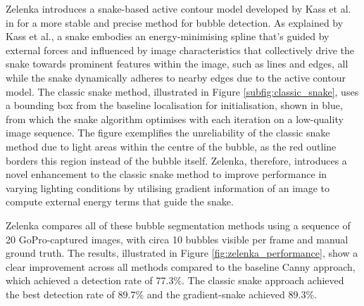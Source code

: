 Zelenka introduces a snake-based active contour model developed by Kass et al. in \cite{kassSnakesActiveContour1988} for a more stable and precise method for bubble detection. As explained by Kass et al., a snake embodies an energy-minimising spline that's guided by external forces and influenced by image characteristics that collectively drive the snake towards prominent features within the image, such as lines and edges, all while the snake dynamically adheres to nearby edges due to the active contour model. The classic snake method, illustrated in Figure \ref{subfig:classic_snake}, uses a bounding box from the baseline localisation for initialisation, shown in blue, from which the snake algorithm optimises with each iteration on a low-quality image sequence. The figure exemplifies the unreliability of the classic snake method due to light areas within the centre of the bubble, as the red outline borders this region instead of the bubble itself. Zelenka, therefore, introduces a novel enhancement to the classic snake method to improve performance in varying lighting conditions by utilising gradient information of an image to compute external energy terms that guide the snake.

Zelenka compares all of these bubble segmentation methods using a sequence of 20 GoPro-captured images, with circa 10 bubbles visible per frame and manual ground truth. The results, illustrated in Figure \ref{fig:zelenka_performance}, show a clear improvement across all methods compared to the baseline Canny approach, which achieved a detection rate of 77.3\%. The classic snake approach achieved the best detection rate of 89.7\% and the gradient-snake achieved 89.3\%.

